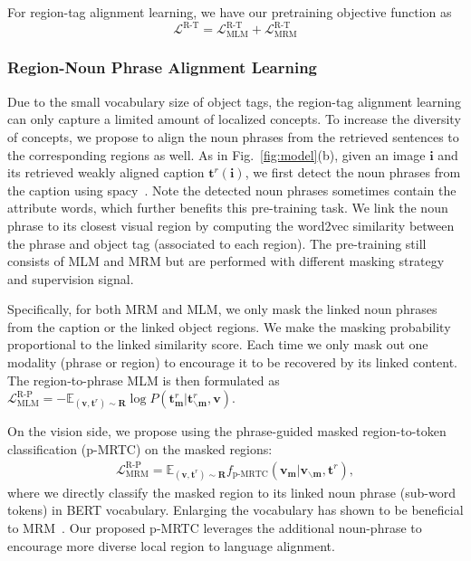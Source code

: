 For region-tag alignment learning, we have our pretraining objective function as 
\begin{equation}\nonumber
\mathcal{L}^{\text{R-T}} =  \mathcal{L}_{\text{MLM}}^{\text{R-T}} + \mathcal{L}_{\text{MRM}}^{\text{R-T}} 
\end{equation}

\subsubsection{Region-Noun Phrase Alignment Learning}

Due to the small vocabulary size of object tags, the region-tag alignment learning can only capture a limited amount of localized concepts.
To increase the diversity of concepts, we propose to align the noun phrases from the retrieved sentences to the corresponding regions as well.
As in Fig.~\ref{fig:model}(b), given an image $\mathbf i$ and its retrieved weakly aligned caption $\mathbf t^r (\mathbf i)$, we first detect the noun phrases from the caption using spacy~\cite{spacy2}.
Note the detected noun phrases sometimes contain the attribute words, which further benefits this pre-training task.
We link the noun phrase to its closest visual region by computing the word2vec similarity between the phrase and object tag (associated to each region).
The pre-training still consists of MLM and MRM but are performed with different masking strategy and supervision signal.

Specifically, for both MRM and MLM, we only mask the linked noun phrases from the caption or the linked object regions.
We make the masking probability proportional to the linked similarity score.
Each time we only mask out one modality (phrase or region) to encourage it to be recovered by its linked content.
The region-to-phrase MLM is then formulated as
$\mathcal{L}_{\text{MLM}}^{\text{R-P}} = - \mathbb{E}_{(\mathbf v, \mathbf t^r)\sim \mathbf R} \log{P(\mathbf t^r_{\mathbf m} |\mathbf t^r_{\backslash \mathbf m}, \mathbf v)}$.

On the vision side, we propose using the phrase-guided masked region-to-token classification (p-MRTC) on the masked regions:
\begin{equation*}
    \begin{split}
    \mathcal{L}_{\text{MRM}}^{\text{R-P}} = \mathbb{E}_{(\mathbf v, \mathbf t^r)\sim \mathbf R}  f_{\text{p-MRTC}}(\mathbf v_{\mathbf m} | \mathbf v_{\backslash \mathbf m}, \mathbf t^r),
    \end{split}
\end{equation*}
where we directly classify the masked region to its linked noun phrase (sub-word tokens) in BERT vocabulary.
Enlarging the vocabulary has shown to be beneficial to MRM~\cite{Zhou_2021_CVPR}.
Our proposed p-MRTC leverages the additional noun-phrase to encourage more diverse local region to language alignment.

